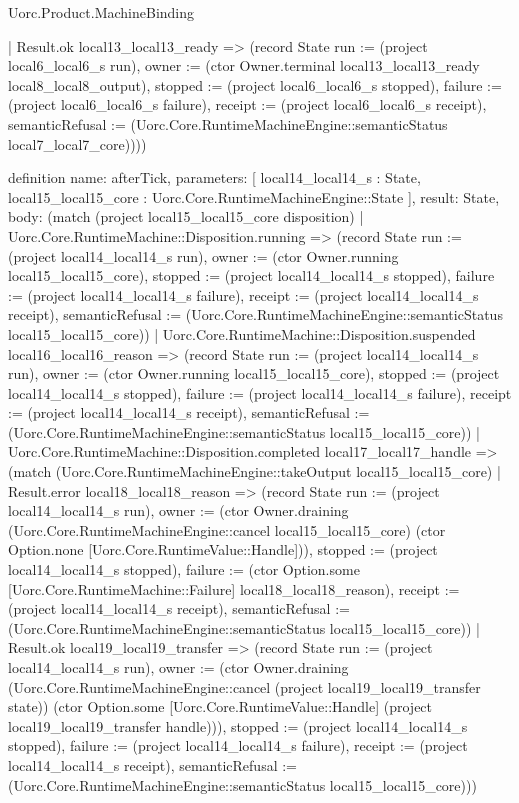 \begin{lexlean}{Uorc.Product.MachineBinding}
\begin{semanticmodule}
{      | Result.ok local13_local13_ready => (record State {run := (project local6_local6_s run), owner := (ctor Owner.terminal local13_local13_ready local8_local8_output), stopped := (project local6_local6_s stopped), failure := (project local6_local6_s failure), receipt := (project local6_local6_s receipt), semanticRefusal := (Uorc.Core.RuntimeMachineEngine::semanticStatus local7_local7_core)})))
}

definition{
  name: afterTick,
  parameters: [
    local14_local14_s : State,
    local15_local15_core : Uorc.Core.RuntimeMachineEngine::State
  ],
  result: State,
  body: (match (project local15_local15_core disposition)
    | Uorc.Core.RuntimeMachine::Disposition.running => (record State {run := (project local14_local14_s run), owner := (ctor Owner.running local15_local15_core), stopped := (project local14_local14_s stopped), failure := (project local14_local14_s failure), receipt := (project local14_local14_s receipt), semanticRefusal := (Uorc.Core.RuntimeMachineEngine::semanticStatus local15_local15_core)})
    | Uorc.Core.RuntimeMachine::Disposition.suspended local16_local16_reason => (record State {run := (project local14_local14_s run), owner := (ctor Owner.running local15_local15_core), stopped := (project local14_local14_s stopped), failure := (project local14_local14_s failure), receipt := (project local14_local14_s receipt), semanticRefusal := (Uorc.Core.RuntimeMachineEngine::semanticStatus local15_local15_core)})
    | Uorc.Core.RuntimeMachine::Disposition.completed local17_local17_handle => (match (Uorc.Core.RuntimeMachineEngine::takeOutput local15_local15_core)
      | Result.error local18_local18_reason => (record State {run := (project local14_local14_s run), owner := (ctor Owner.draining (Uorc.Core.RuntimeMachineEngine::cancel local15_local15_core) (ctor Option.none [Uorc.Core.RuntimeValue::Handle])), stopped := (project local14_local14_s stopped), failure := (ctor Option.some [Uorc.Core.RuntimeMachine::Failure] local18_local18_reason), receipt := (project local14_local14_s receipt), semanticRefusal := (Uorc.Core.RuntimeMachineEngine::semanticStatus local15_local15_core)})
      | Result.ok local19_local19_transfer => (record State {run := (project local14_local14_s run), owner := (ctor Owner.draining (Uorc.Core.RuntimeMachineEngine::cancel (project local19_local19_transfer state)) (ctor Option.some [Uorc.Core.RuntimeValue::Handle] (project local19_local19_transfer handle))), stopped := (project local14_local14_s stopped), failure := (project local14_local14_s failure), receipt := (project local14_local14_s receipt), semanticRefusal := (Uorc.Core.RuntimeMachineEngine::semanticStatus local15_local15_core)}))
}
\end{semanticmodule}
\end{lexlean}
